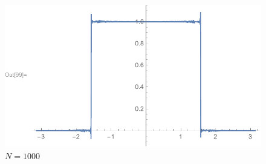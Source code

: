 \documentclass{article}
\begin{document}
\begin{figure}[H]
\begin{minipage}[b]{0.49\textwidth}
  \end{minipage}
    \hfill
  \begin{minipage}[b]{0.49\textwidth}
    \includegraphics[width=\textwidth]{part3_plot4.pdf}
    \caption{$N=1000$}

  \end{minipage}
\end{figure}
\end{document}
